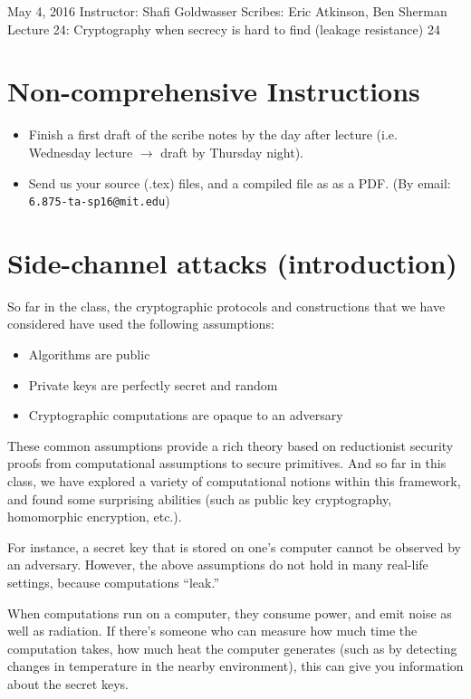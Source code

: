 \documentclass[10pt]{article}
\newcommand{\scribes}{Eric Atkinson, Ben Sherman}
\newcommand{\lecnumber}{24}
\newcommand{\lectitle}{Cryptography when secrecy is hard to find (leakage resistance)}
\newcommand{\thedate}{May 4, 2016}
\begin{document}


{\thedate}
{Instructor: Shafi Goldwasser}
{Scribes: \scribes}
{Lecture \lecnumber: \lectitle}
{\lecnumber}

\section{Non-comprehensive Instructions}
\begin{itemize}
	\item Finish a first draft of the scribe notes by the day after lecture (i.e. Wednesday lecture $\rightarrow$ draft by Thursday night).
	\item Send us your source (.tex) files, and a compiled file as as a PDF. (By email: {\tt 6.875-ta-sp16@mit.edu})
\end{itemize}

\section{Side-channel attacks (introduction)}

So far in the class, the cryptographic protocols and constructions that we have considered have used the following assumptions:
\begin{itemize}
\item Algorithms are public
\item Private keys are perfectly secret and random
\item Cryptographic computations are opaque to an adversary
\end{itemize}

These common assumptions provide a rich theory based on reductionist security proofs from computational assumptions to secure primitives. And so far in this class, we have explored a variety of computational notions within this framework, and found some surprising abilities (such as public key cryptography, homomorphic encryption, etc.).

For instance, a secret key that is stored on one's computer cannot be observed by an adversary. However, the above assumptions do not hold in many real-life settings, because computations ``leak.''

When computations run on a computer, they consume power, and emit noise as well as radiation. If there's someone who can measure how much time the computation takes, how much heat the computer generates (such as by detecting changes in temperature in the nearby environment), this can give you information about the secret keys. 
\end{document}
